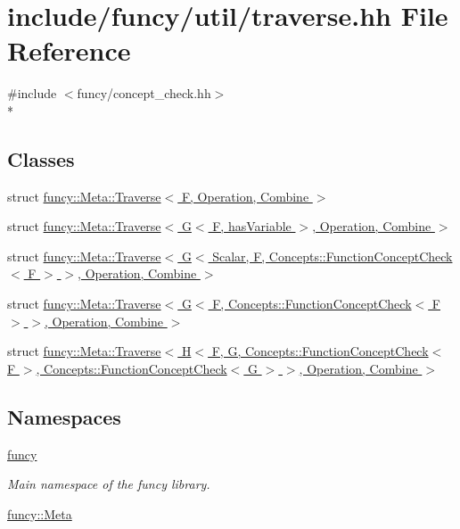 \hypertarget{traverse_8hh}{\section{include/funcy/util/traverse.hh File Reference}
\label{traverse_8hh}
}
{\ttfamily \#include $<$funcy/concept\-\_\-check.\-hh$>$}\\*
\subsection*{Classes}
\begin{DoxyCompactItemize}
\item 
struct \hyperlink{structfuncy_1_1Meta_1_1Traverse}{funcy\-::\-Meta\-::\-Traverse$<$ F, Operation, Combine $>$}
\item 
struct \hyperlink{structfuncy_1_1Meta_1_1Traverse_3_01G_3_01F_00_01hasVariable_01_4_00_01Operation_00_01Combine_01_4}{funcy\-::\-Meta\-::\-Traverse$<$ G$<$ F, has\-Variable $>$, Operation, Combine $>$}
\item 
struct \hyperlink{structfuncy_1_1Meta_1_1Traverse_3_01G_3_01Scalar_00_01F_00_01Concepts_1_1FunctionConceptCheck_3_d9950d1c48a2813691c7a0d506636e4e}{funcy\-::\-Meta\-::\-Traverse$<$ G$<$ Scalar, F, Concepts\-::\-Function\-Concept\-Check$<$ F $>$ $>$, Operation, Combine $>$}
\item 
struct \hyperlink{structfuncy_1_1Meta_1_1Traverse_3_01G_3_01F_00_01Concepts_1_1FunctionConceptCheck_3_01F_01_4_01_44008b3cc655196582c54171c951cc7a}{funcy\-::\-Meta\-::\-Traverse$<$ G$<$ F, Concepts\-::\-Function\-Concept\-Check$<$ F $>$ $>$, Operation, Combine $>$}
\item 
struct \hyperlink{structfuncy_1_1Meta_1_1Traverse_3_01H_3_01F_00_01G_00_01Concepts_1_1FunctionConceptCheck_3_01F_084070fc36daa4be3c051d8e83d53a122}{funcy\-::\-Meta\-::\-Traverse$<$ H$<$ F, G, Concepts\-::\-Function\-Concept\-Check$<$ F $>$, Concepts\-::\-Function\-Concept\-Check$<$ G $>$ $>$, Operation, Combine $>$}
\end{DoxyCompactItemize}
\subsection*{Namespaces}
\begin{DoxyCompactItemize}
\item 
\hyperlink{namespacefuncy}{funcy}
\begin{DoxyCompactList}\small\item\em Main namespace of the funcy library. \end{DoxyCompactList}\item 
\hyperlink{namespacefuncy_1_1Meta}{funcy\-::\-Meta}
\end{DoxyCompactItemize}
